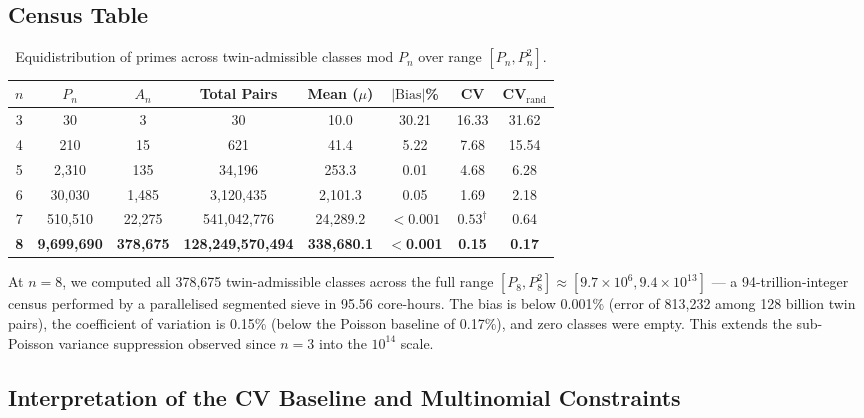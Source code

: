 \documentclass[11pt]{article}
\begin{document}
\subsection{Census Table}

\begin{table}[h]
\centering
\caption{Equidistribution of primes across twin-admissible classes mod $P_n$ over range $[P_n, P_n^2]$.}
\label{tab:numerical}
\begin{tabular}{cccccccc}
\toprule
$n$ & $P_n$ & $A_n$ & Total Pairs & Mean ($\mu$) & $|\text{Bias}|$\% & CV & CV$_{\text{rand}}$ \\
\midrule
3 & 30 & 3 & 30 & 10.0 & 30.21 & 16.33 & 31.62 \\
4 & 210 & 15 & 621 & 41.4 & 5.22 & 7.68 & 15.54 \\
5 & 2{,}310 & 135 & 34{,}196 & 253.3 & 0.01 & 4.68 & 6.28 \\
6 & 30{,}030 & 1{,}485 & 3{,}120{,}435 & 2{,}101.3 & 0.05 & 1.69 & 2.18 \\
7 & 510{,}510 & 22{,}275 & 541{,}042{,}776 & 24{,}289.2 & $<0.001$ & $0.53^{\dagger}$ & 0.64 \\
\textbf{8} & \textbf{9{,}699{,}690} & \textbf{378{,}675} & \textbf{128{,}249{,}570{,}494} & \textbf{338{,}680.1} & \textbf{$<$0.001} & \textbf{0.15} & \textbf{0.17} \\
\bottomrule
\end{tabular}

\vspace{0.5em}
\end{table}

\noindent At $n=8$, we computed all 378{,}675 twin-admissible classes across the full range $[P_8, P_8^2] \approx [9.7 \times 10^6, 9.4 \times 10^{13}]$ --- a 94-trillion-integer census performed by a parallelised segmented sieve in 95.56 core-hours. The bias is below 0.001\% (error of 813{,}232 among 128 billion twin pairs), the coefficient of variation is 0.15\% (below the Poisson baseline of 0.17\%), and zero classes were empty. This extends the sub-Poisson variance suppression observed since $n=3$ into the $10^{14}$ scale.

\subsection{Interpretation of the CV Baseline and Multinomial Constraints}
\end{document}
